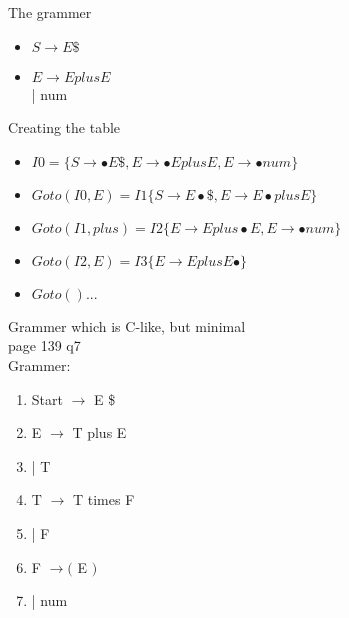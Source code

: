 \documentclass[11pt]{article}
\begin{document}
    The grammer
    \begin{itemize}
        \item $S \to E \$$
        \item $E \to E plus E$ \\
            | num
    \end{itemize}

    Creating the table
    \begin{itemize}
        \item $I0 = \{ S \to \bullet E \$, E \to \bullet E plus E, E \to \bullet num \}$
        \item $Goto(I0, E) = I1 \{ S \to E \bullet \$, E \to E \bullet plus E \}$
        \item $Goto(I1, plus) = I2 \{ E \to E plus \bullet E, E \to \bullet num \}$
        \item $Goto(I2, E) = I3 \{ E \to E plus E \bullet \}$
        \item $Goto()...$

    \end{itemize}

    Grammer which is C-like, but minimal \\

    page 139 q7 \\
    Grammer: \\
    \begin{enumerate}
        \item Start $\to$ E \$
        \item E $\to$ T plus E
        \item   | T
        \item T $\to$ T times F
        \item   | F
        \item F $\to ($ E $)$
        \item   | num
    \end{enumerate}
\end{document}
